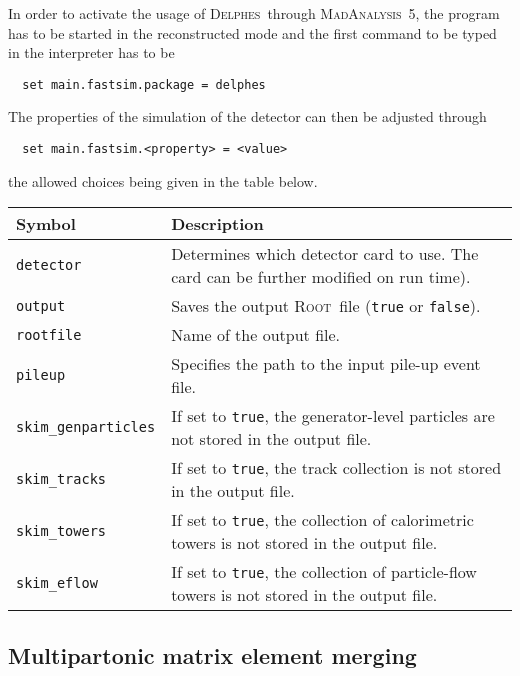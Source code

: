 \documentclass[a4paper]{article}
\newcommand{\MA}{\textsc{MadAnalysis}~5}
\newcommand{\DEL}{\textsc{Delphes}}
\newcommand{\ROOT}{\textsc{Root}}
\begin{document}
\noindent In order to activate the usage of \DEL\ through \MA, the program has to be
started in the reconstructed mode and the first command to be typed in the
interpreter has to be
{\color{ao}\begin{verbatim}
  set main.fastsim.package = delphes
\end{verbatim}}
\noindent The properties of the simulation of the detector can then be adjusted through
{\color{ao} \begin{verbatim}  set main.fastsim.<property> = <value>
\end{verbatim}}
the allowed choices being given in the table below.
\renewcommand{\arraystretch}{1.2}%
\begin{center}\begin{tabular}{l p{8.4cm}}
\hline
Symbol& Description\\
\hline
\color{ao} \verb?detector? & Determines which detector card to use. The card can be further
  modified on run time).\\
\color{ao} \verb?output?   & Saves the output \ROOT\ file (\verb+true+ or \verb+false+).\\
\color{ao} \verb?rootfile? & Name of the output file.\\
\color{ao} \verb?pileup? & Specifies the path to the input pile-up event file.\\
\color{ao} \verb?skim_genparticles? & If set to \verb?true?, the generator-level
  particles are not stored in the output file.\\
\color{ao} \verb?skim_tracks? & If set to \verb?true?, the track collection is not stored
  in the output file.\\
\color{ao} \verb?skim_towers? & If set to \verb?true?, the collection of calorimetric
  towers is not stored in the output file.\\
\color{ao} \verb?skim_eflow? & If set to \verb?true?, the collection of particle-flow
  towers is not stored in the output file.\\
\hline
\end{tabular}
\end{center}

\vspace{2cm}

\begin{shaded}
\section{\Large Multipartonic matrix element merging}
\end{shaded}
\end{document}
